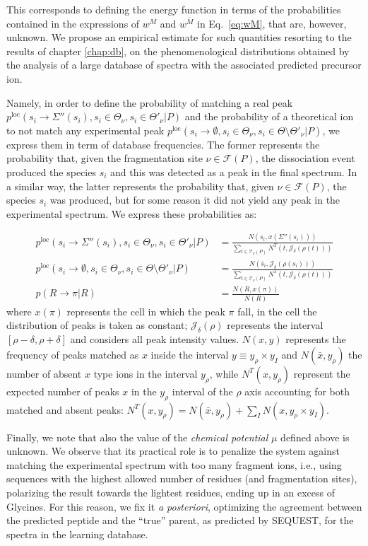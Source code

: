 This corresponds to defining the energy function in terms of the probabilities
contained in the expressions of $w^M$ and $w^{\bar M}$ in Eq.~\ref{eq:wM}, that
are, however, unknown. We propose an empirical estimate for such quantities
resorting to the results of chapter \ref{chap:db}, on the
phenomenological distributions obtained by the analysis of a large  database of
spectra with the associated predicted precursor ion.

Namely, in order to define the probability of matching a real peak
$p^\text{loc}(s_i\to\Sigma''(s_i),s_i\in\Theta_\nu,s_i\in\Theta'_\nu|P)$
and the probability of a theoretical ion to not match any experimental peak
$p^\text{loc}(s_i\to\emptyset,s_i\in\Theta_\nu,s_i\in\Theta\setminus\Theta'_\nu|P)$,
we express them in term of database frequencies.
The former represents the probability that, given the fragmentation site 
$\nu\in\mathcal F(P)$, the dissociation event produced the species $s_i$ and
this was detected as a peak in the final spectrum.
In a similar way, the latter represents the probability that, given
$\nu\in\mathcal F(P)$, the species $s_i$ was produced, but for some reason it
did not yield any peak in the experimental spectrum.
We express these probabilities as:

\begin{align}
p^\text{loc}(s_i\to\Sigma''(s_i),s_i\in\Theta_\nu,s_i\in\Theta'_\nu|P)
&=
\frac{N(s_i,x(\Sigma''(s_i)))}
{\displaystyle
\sum_{t\in\mathcal T_\nu(P)}N^T(t,\mathcal J_\delta(\rho(t)))}
\\
p^\text{loc}(s_i\to\emptyset,s_i\in\Theta_\nu,s_i\in\Theta\setminus\Theta'_\nu|P)
&=
\frac{N(\bar s_i,\mathcal J_\delta(\rho(s_i)))}
{\displaystyle
\sum_{t\in\mathcal T_\nu(P)}N^T(t,\mathcal J_\delta(\rho(t)))}\\
p(R\to\pi|R)
&=
\frac{N(R,x(\pi))}{N(R)}
\end{align}
where $x(\pi)$ represents the cell in which the peak $\pi$ fall, in the cell the
distribution of peaks is taken as constant; $\mathcal J_\delta(\rho)$ represents
the interval $[\rho-\delta,\rho+\delta]$ and considers all peak intensity
values.
$N(x,y)$ represents the frequency of peaks matched as $x$ inside the interval
$y\equiv y_\rho\times y_I$ and $N(\bar x,y_\rho)$ the number of absent $x$ type
ions in the interval $y_\rho$, while $N^T(x,y_\rho)$ represent the expected number of peaks $x$ in the
$y_\rho$ interval of the $\rho$ axis accounting for both matched and absent peaks:
$N^T(x,y_\rho)= N(\bar x,y_\rho)+\sum_I N(x,y_\rho\times y_I)$.

 Finally, we note that also the value of the
\emph{chemical potential} $\mu$ defined above is unknown. 
We observe that its practical role is to penalize the system against matching
the experimental spectrum with too many fragment ions, i.e., using sequences
with the highest allowed  number of residues (and fragmentation sites),
polarizing the result towards the lightest residues, ending up in an excess
of Glycines.
For this reason, we fix it 
\emph{a posteriori}, optimizing the agreement between the predicted peptide and
the ``true'' parent, as predicted  by SEQUEST, for the spectra in the learning
database.

